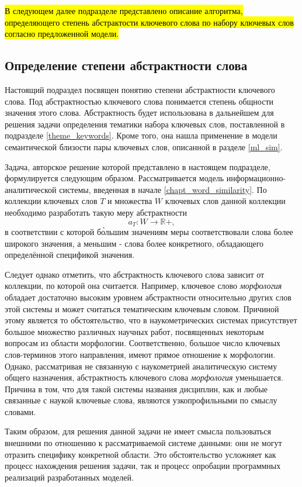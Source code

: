 \hl{В следующем далее подразделе представлено описание алгоритма, определяющего степень абстрактости ключевого слова по набору ключевых слов согласно предложенной модели.}

\subsection{Определение степени абстрактности слова} \label{abstractness}
Настоящий подраздел посвящен понятию степени абстрактности  ключевого слова. Под абстрактностью ключевого слова понимается степень общности значения этого слова. Абстрактность будет использована в дальнейшем для решения задачи определения тематики набора ключевых слов, поставленной в подразделе \ref{theme_keywords}. Кроме того, она нашла применение в модели семантической близости пары ключевых слов, описанной в разделе \ref{ml_sim}.

Задача, авторское решение которой представлено в настоящем подразделе, формулируется следующим образом. Рассматривается модель информационно-аналитической системы, введенная в начале \ref{chapt_word_similarity}. По коллекции ключевых слов $T$ и множества $W$ ключевых слов данной коллекции необходимо разработать такую меру абстрактности
    $$a_T : W \rightarrow \mathbb{R}+,$$
%
в соответствии с которой б\`ольшим значениям меры соответствовали слова более широкого значения, а меньшим - слова более конкретного, обладающего определённой спецификой значения.


Следует однако отметить, что абстрактность ключевого слова зависит от коллекции, по которой она считается. Например, ключевое слово \emph{морфология} обладает достаточно высоким уровнем абстрактности относительно других слов этой системы и может считаться тематическим ключевым словом. Причиной этому является то обстоятельство, что в наукометрических системах присутствует большое множество различных научных работ, посвященных некоторым вопросам из области морфологии. Соответственно, большое число ключевых слов-терминов этого направления, имеют прямое отношение к морфологии. Однако, рассматривая не связанную с наукометрией аналитическую систему общего назначения, абстрактность ключевого слова \emph{морфология} уменьшается. Причина в том, что для такой системы названия дисциплин, как и любые связанные с наукой ключевые слова, являются узкопрофильными по смыслу словами.

Таким образом, для решения данной задачи не имеет смысла пользоваться внешними по отношению к рассматриваемой системе данными: они не могут отразить специфику конкретной области. Это обстоятельство усложняет как процесс нахождения решения задачи, так и процесс опробации программных реализаций разработанных моделей.

